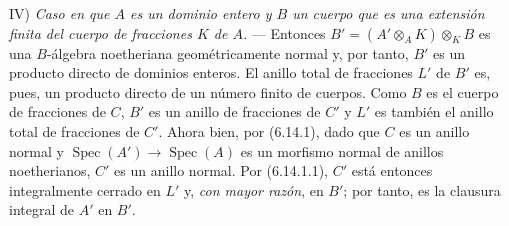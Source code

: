 IV) \emph{Caso en que $A$ es un dominio entero y $B$ un cuerpo que
es una extensión finita del cuerpo de fracciones $K$ de $A$.} ---
Entonces $B'=(A'\otimes_A K)\otimes_K B$ es una $B$-álgebra
noetheriana geométricamente normal y, por tanto, $B'$ es un producto directo
de dominios enteros. El anillo total de fracciones $L'$ de $B'$ es,
pues, un producto directo de un número finito de cuerpos. Como $B$
es el cuerpo de fracciones de $C$, $B'$ es un anillo de fracciones de
$C'$ y $L'$ es también el anillo total de fracciones de $C'$. Ahora
bien, por (6.14.1), dado que $C$ es un anillo normal y
$\operatorname{Spec}(A')\to\operatorname{Spec}(A)$ es un morfismo
normal de anillos noetherianos, $C'$ es un anillo normal. Por
(6.14.1.1), $C'$ está entonces integralmente cerrado en $L'$ y, \emph{con
mayor razón}, en $B'$; por tanto, es la clausura integral de $A'$ en
$B'$.

